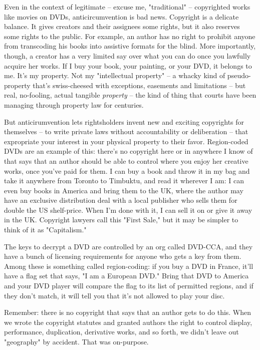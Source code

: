 Even in the context of legitimate -- excuse me, "traditional" --
copyrighted works like movies on DVDs, anticircumvention is bad
news. Copyright is a delicate balance. It gives creators and their
assignees some rights, but it also reserves some rights to the
public. For example, an author has no right to prohibit anyone from
transcoding his books into assistive formats for the blind. More
importantly, though, a creator has a very limited say over what you
can do once you lawfully acquire her works. If I buy your book,
your painting, or your DVD, it belongs to me. It's my property. Not
my "intellectual property" -- a whacky kind of pseudo-property
that's swiss-cheesed with exceptions, easements and limitations --
but real, no-fooling, actual tangible \emph{property} -- the kind
of thing that courts have been managing through property law for
centuries.

But anticirumvention lets rightsholders invent new and exciting
copyrights for themselves -- to write private laws without
accountability or deliberation -- that expropriate your interest in
your physical property to their favor. Region-coded DVDs are an
example of this: there's no copyright here or in anywhere I know of
that says that an author should be able to control where you enjoy
her creative works, once you've paid for them. I can buy a book and
throw it in my bag and take it anywhere from Toronto to Timbuktu,
and read it wherever I am: I can even buy books in America and
bring them to the UK, where the author may have an exclusive
distribution deal with a local publisher who sells them for double
the US shelf-price. When I'm done with it, I can sell it on or give
it away in the UK. Copyright lawyers call this "First Sale," but it
may be simpler to think of it as "Capitalism."

The keys to decrypt a DVD are controlled by an org called DVD-CCA,
and they have a bunch of licensing requirements for anyone who gets
a key from them. Among these is something called region-coding: if
you buy a DVD in France, it'll have a flag set that says, "I am a
European DVD." Bring that DVD to America and your DVD player will
compare the flag to its list of permitted regions, and if they
don't match, it will tell you that it's not allowed to play your
disc.

Remember: there is no copyright that says that an author gets to do
this. When we wrote the copyright statutes and granted authors the
right to control display, performance, duplication, derivative
works, and so forth, we didn't leave out "geography" by accident.
That was on-purpose.

